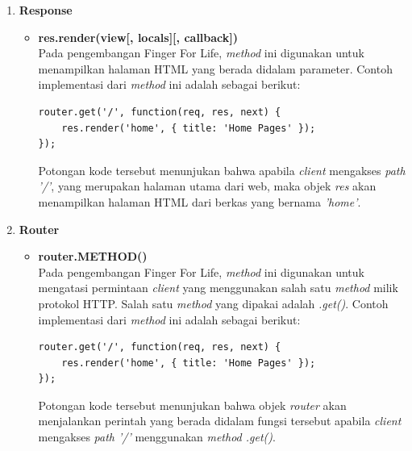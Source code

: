 \begin{enumerate}
\begin{enumerate}
		\item \textbf{Response}
		\begin{itemize}
			\item \textbf{res.render(view[, locals][, callback])} \\
			Pada pengembangan Finger For Life, \textit{method} ini digunakan untuk menampilkan halaman HTML yang berada didalam parameter. Contoh implementasi dari \textit{method} ini adalah sebagai berikut:
\begin{lstlisting}[caption={Implementasi \textit{method} .render()}]
router.get('/', function(req, res, next) {
	res.render('home', { title: 'Home Pages' });
});
\end{lstlisting}
			Potongan kode tersebut menunjukan bahwa apabila \textit{client} mengakses \textit{path '/'}, yang merupakan halaman utama dari web, maka objek \textit{res} akan menampilkan halaman HTML dari berkas yang bernama \textit{'home'}.
		\end{itemize}
	
		\item \textbf{Router}
		\begin{itemize}
			\item \textbf{router.METHOD()} \\
			Pada pengembangan Finger For Life, \textit{method} ini digunakan untuk mengatasi permintaan \textit{client} yang menggunakan salah satu \textit{method} milik protokol HTTP. Salah satu \textit{method} yang dipakai adalah \textit{.get()}. Contoh implementasi dari \textit{method} ini adalah sebagai berikut:
\begin{lstlisting}[caption={Implementasi \textit{method} .get()}]
router.get('/', function(req, res, next) {
	res.render('home', { title: 'Home Pages' });
});
\end{lstlisting}
			Potongan kode tersebut menunjukan bahwa objek \textit{router} akan menjalankan perintah yang berada didalam fungsi tersebut apabila \textit{client} mengakses \textit{path '/'} menggunakan \textit{method .get()}.
		\end{itemize}
	\end{enumerate}
	

\end{enumerate}
